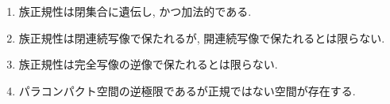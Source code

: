 \documentclass[uplatex, dvipdfmx, a4paper, 12pt, class=jsarticle, crop=false]{standalone}
\begin{document}
\renewcommand{\labelenumi}{(\alph{enumi})}
\begin{problem}[5.1.C]\label{eng-5-1-C-problem}
    \begin{enumerate}
        \item 族正規性は閉集合に遺伝し, かつ加法的である.
        \item 族正規性は閉連続写像で保たれるが, 開連続写像で保たれるとは限らない.
        \item 族正規性は完全写像の逆像で保たれるとは限らない.
        \item パラコンパクト\Hausdorff 空間の逆極限であるが正規ではない空間が存在する.
    \end{enumerate}
\end{problem}
\end{document}
